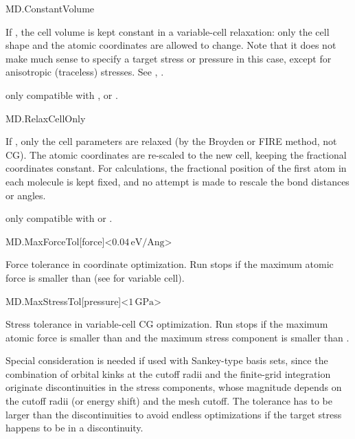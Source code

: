 \begin{fdflogicalF}{MD.ConstantVolume}

  If \fdftrue, the cell volume is kept constant in a variable-cell
  relaxation: only the cell shape and the atomic coordinates are
  allowed to change.  Note that it does not make much sense to specify
  a target stress or pressure in this case, except for anisotropic
  (traceless) stresses.  See ,
  .

  \note only compatible with ,
   or .

\end{fdflogicalF}

\begin{fdflogicalF}{MD.RelaxCellOnly}

  If \fdftrue, only the cell parameters are relaxed (by the Broyden or
  FIRE method, not CG). The atomic coordinates are re-scaled to the
  new cell, keeping the fractional coordinates constant. For
   calculations, the fractional position of the first
  atom in each molecule is kept fixed, and no attempt is made to
  rescale the bond distances or angles.

  \note only compatible with  or .

\end{fdflogicalF}

\begin{fdfentry}{MD.MaxForceTol}[force]<$0.04\,\mathrm{eV/Ang}$>
  
  Force tolerance in coordinate optimization.
  Run stops if the maximum atomic force is
  smaller than  (see 
  for variable cell).

\end{fdfentry}

\begin{fdfentry}{MD.MaxStressTol}[pressure]<$1\,\mathrm{GPa}$>
  
  Stress tolerance in variable-cell CG optimization. Run stops if the
  maximum atomic force is smaller than  and the
  maximum stress component is smaller than .

  Special consideration is needed if used with Sankey-type basis sets,
  since the combination of orbital kinks at the cutoff radii and the
  finite-grid integration originate discontinuities in the stress
  components, whose magnitude depends on the cutoff radii (or energy
  shift) and the mesh cutoff. The tolerance has to be larger than the
  discontinuities to avoid endless optimizations if the target stress
  happens to be in a discontinuity.

\end{fdfentry}

